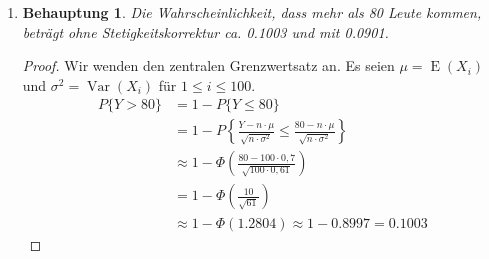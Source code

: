\documentclass[a4paper]{scrartcl}
\newtheorem*{behaupt}{Behauptung}
\newcommand{\e}{\operatorname{E}}
\newcommand{\var}{\operatorname{Var}}
\begin{document}
\begin{enumerate}[label=\bfseries\arabic*.]
\begin{enumerate}[label=(\alph*)]
            \item
                \begin{behaupt}
                    Die Wahrscheinlichkeit, dass mehr als 80 Leute kommen,
                    beträgt ohne Stetigkeitskorrektur ca. \num{0,1003} und mit
                    \num{0,0901}.
                \end{behaupt}
                \begin{proof}
                    Wir wenden den zentralen Grenzwertsatz an.
                    Es seien $\mu = \e(X_i)$ und $\sigma^2 = \var(X_i)$ für
                    $1 \leq i \leq 100$.
                    \begin{equation*}
                        \begin{split}
                            P\{Y > 80\} &= 1 - P\{Y \leq 80\} \\
                            &= 1 - P \left\lbrace
                            \frac{Y - n \cdot \mu}{\sqrt{n \cdot \sigma^2}}
                            \leq
                            \frac{80 - n \cdot \mu}{\sqrt{n\cdot \sigma^2}}
                            \right\rbrace \\
                            &\approx 1 - \Phi \left(
                            \frac{80 - 100 \cdot 0,7}{\sqrt{100 \cdot 0,61}}
                            \right) \\
                            &= 1 - \Phi \left( \frac{10}{\sqrt{61}} \right) \\
                            &\approx 1 - \Phi(\num{1,2804})
                            \approx 1 - \num{0,8997} = \num{0,1003}
                        \end{split}
                    \end{equation*}

\end{proof}
\end{enumerate}
\end{enumerate}
\end{document}
